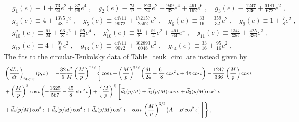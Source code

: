 \documentclass[aps,prd,twocolumn,showpacs,groupedaddress,nofootinbib]{revtex4}
\begin{document}
\begin{widetext}
\begin{align*}
&g_1(e) \equiv 1 + \frac{73}{24} e^2  + \frac{37}{96}e^4\;,
\quad
g_2(e) \equiv  \frac{73}{12} + \frac{823}{24} e^2 + \frac{949}{32}e^4
+ \frac{491}{192}e^6 \;,
\quad
g_3(e) \equiv \frac{1247}{336} + \frac{9181}{672} e^2\;,\\
&g_4(e)  \equiv 4 + \frac{1375}{48} e^2  \;,
\quad
g_5(e) \equiv \frac{44711}{9072} + \frac{172157}{2592} e^2 \;,
\quad
g_6(e) \equiv \frac{33}{16} + \frac{359}{32} e^2  \;,
\quad
g_9(e) \equiv 1 + \frac{7}{8} e^2   \;,\\
&g_{10}^{a}(e) \equiv \frac{61}{24} + \frac{63}{8}e^2   + \frac{95}{64}e^4 \;,
\quad
g_{10}^{b}(e) \equiv \frac{61}{8} + \frac{91}{4}e^2  + \frac{461}{64}e^4 \;,
\quad
g_{11}(e) \equiv \frac{1247}{336} + \frac{425}{336} e^2 \;, \\
&g_{12}(e) \equiv 4 + \frac{97}{8} e^2 \;, 
\quad
g_{13}(e) \equiv \frac{44711}{9072} + \frac{302893}{6048} e^2 \;,
\quad
g_{14}(e) \equiv \frac{33}{16} + \frac{95}{16} e^2 \;,
\end{align*}
The fits to the circular-Teukolsky data of Table~\ref{teuk_circ} are
instead given by
\begin{align}
&\left(\frac{dL_z}{dt}\right)_{\rm fit\,
    circ}
(p,\iota\,)=-\frac{32}{5} \frac{\mu^2}{M}
  \left(\frac{M}{p}\right)^{7/2} \Bigg\{ \cos\iota +
  \left(\frac{M}{p}\right)^{3/2} \left(\frac{61}{24}
  -\frac{61}{8}\,\cos^2\iota + 4\pi \cos\iota\right)
  -\frac{1247}{336}\left(\frac{M}{p}\right) \cos\iota \nonumber\\& 
  +\left(\frac{M}{p}\right)^2 \,\cos\iota \left(-\frac{1625}{567} -
  \frac{45}{8}\,\sin^2\iota\right) +
  \left(\frac{M}{p}\right)^{\frac{5}{2}}
  \Bigg[\widetilde{d}_1(p/M)+\widetilde{d}_2(p/M)\cos\iota\,+
    \widetilde{d}_3(p/M)\cos^2\iota\nonumber\\&
    +\widetilde{d}_4(p/M)\cos^3\iota\,+
    \widetilde{d}_5(p/M)\cos^4\iota+\widetilde{d}_6(p/M)\cos^5\iota+
    \cos\iota\,\left(\frac{M}{p}\right)^{3/2}\left(A+B\cos^2\iota\,
    \right)\Bigg]\Bigg\}\;,\label{LdotFitCirc} \\
\end{align}


\end{widetext}
\end{document}
